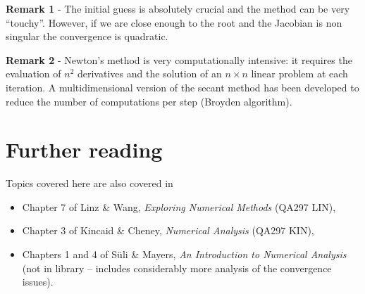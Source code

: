 \noindent
\textbf{Remark 1} - The initial guess is absolutely crucial and the
method can be very ``touchy''.  However, if we are close enough to the
root and the Jacobian is non singular the convergence is quadratic.

\noindent
\textbf{Remark 2} - Newton's method is very computationally intensive:
it requires the evaluation of $n^2$ derivatives and the solution of an
$n \times n$ linear problem at each iteration.  A multidimensional
version of the secant method has been developed to reduce the number
of computations per step (Broyden algorithm).


\section*{Further reading}

Topics covered here are also covered in
\begin{itemize}
\item Chapter 7 of Linz \& Wang, \textit{Exploring Numerical Methods}
  (QA297 LIN),
\item Chapter 3 of Kincaid \& Cheney, \textit{Numerical Analysis}
  (QA297 KIN),
\item Chapters 1 and 4 of S{\"u}li \& Mayers, \textit{An Introduction
    to Numerical Analysis} (not in library -- includes considerably
  more analysis of the convergence issues).
\end{itemize}
